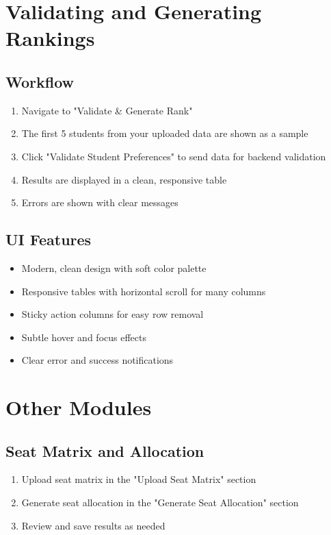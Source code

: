 \documentclass[12pt]{article}
\begin{document}
\section{Validating and Generating Rankings}
\subsection{Workflow}
\begin{enumerate}
    \item Navigate to "Validate \& Generate Rank"
    \item The first 5 students from your uploaded data are shown as a sample
    \item Click "Validate Student Preferences" to send data for backend validation
    \item Results are displayed in a clean, responsive table
    \item Errors are shown with clear messages
\end{enumerate}

\subsection{UI Features}
\begin{itemize}
    \item Modern, clean design with soft color palette
    \item Responsive tables with horizontal scroll for many columns
    \item Sticky action columns for easy row removal
    \item Subtle hover and focus effects
    \item Clear error and success notifications
\end{itemize}

\section{Other Modules}
\subsection{Seat Matrix and Allocation}
\begin{enumerate}
    \item Upload seat matrix in the "Upload Seat Matrix" section
    \item Generate seat allocation in the "Generate Seat Allocation" section
    \item Review and save results as needed
\end{enumerate}
\end{document}
